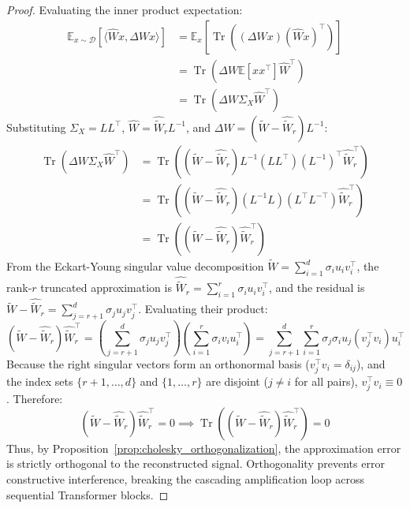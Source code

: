 \documentclass{article}
\begin{document}
\begin{proof}
Evaluating the inner product expectation:
\begin{align}
    \mathbb{E}_{x \sim \mathcal{D}}\left[ \langle \hat{W} x, \Delta W x \rangle \right] &= \mathbb{E}_x \left[ \operatorname{Tr}\left( (\Delta W x) (\hat{W} x)^\top \right) \right] \nonumber \\
    &= \operatorname{Tr}\left( \Delta W \mathbb{E}[x x^\top] \hat{W}^\top \right) \nonumber \\
    &= \operatorname{Tr}\left( \Delta W \Sigma_X \hat{W}^\top \right)
\end{align}
Substituting $\Sigma_X = L L^\top$, $\hat{W} = \hat{\tilde{W}}_r L^{-1}$, and $\Delta W = (\tilde{W} - \hat{\tilde{W}}_r) L^{-1}$:
\begin{align}
    \operatorname{Tr}\left( \Delta W \Sigma_X \hat{W}^\top \right) &= \operatorname{Tr}\left( (\tilde{W} - \hat{\tilde{W}}_r) L^{-1} (L L^\top) (L^{-1})^\top \hat{\tilde{W}}_r^\top \right) \nonumber \\
    &= \operatorname{Tr}\left( (\tilde{W} - \hat{\tilde{W}}_r) (L^{-1} L) (L^\top L^{-\top}) \hat{\tilde{W}}_r^\top \right) \nonumber \\
    &= \operatorname{Tr}\left( (\tilde{W} - \hat{\tilde{W}}_r) \hat{\tilde{W}}_r^\top \right)
\end{align}
From the Eckart-Young singular value decomposition $\tilde{W} = \sum_{i=1}^d \sigma_i u_i v_i^\top$, the rank-$r$ truncated approximation is $\hat{\tilde{W}}_r = \sum_{i=1}^r \sigma_i u_i v_i^\top$, and the residual is $\tilde{W} - \hat{\tilde{W}}_r = \sum_{j=r+1}^d \sigma_j u_j v_j^\top$.
Evaluating their product:
\begin{equation}
    (\tilde{W} - \hat{\tilde{W}}_r) \hat{\tilde{W}}_r^\top = \left( \sum_{j=r+1}^d \sigma_j u_j v_j^\top \right) \left( \sum_{i=1}^r \sigma_i v_i u_i^\top \right) = \sum_{j=r+1}^d \sum_{i=1}^r \sigma_j \sigma_i u_j (v_j^\top v_i) u_i^\top
\end{equation}
Because the right singular vectors form an orthonormal basis ($v_j^\top v_i = \delta_{ij}$), and the index sets $\{r+1, \dots, d\}$ and $\{1, \dots, r\}$ are disjoint ($j \ne i$ for all pairs), $v_j^\top v_i \equiv 0$.
Therefore:
\begin{equation}
    (\tilde{W} - \hat{\tilde{W}}_r) \hat{\tilde{W}}_r^\top = 0 \implies \operatorname{Tr}\left( (\tilde{W} - \hat{\tilde{W}}_r) \hat{\tilde{W}}_r^\top \right) = 0
\end{equation}
Thus, by Proposition~\ref{prop:cholesky_orthogonalization}, the approximation error is strictly orthogonal to the reconstructed signal. Orthogonality prevents error constructive interference, breaking the cascading amplification loop across sequential Transformer blocks.
\end{proof}
\end{document}

